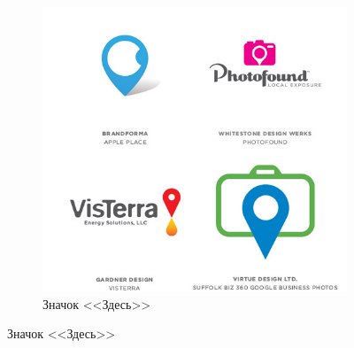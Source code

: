 \begin{figure}[h!]
  \vfill

  \centering
  \begin{subfigure}{.45\textwidth}
    \centering
    \includegraphics[width=\linewidth]{images/supplement/logolounge/2013/Znachok-zdes}
    \caption{Значок <<Здесь>>}
    \label{fig:logolounge:2013:znachok-zdes}
  \end{subfigure}
\end{figure}
